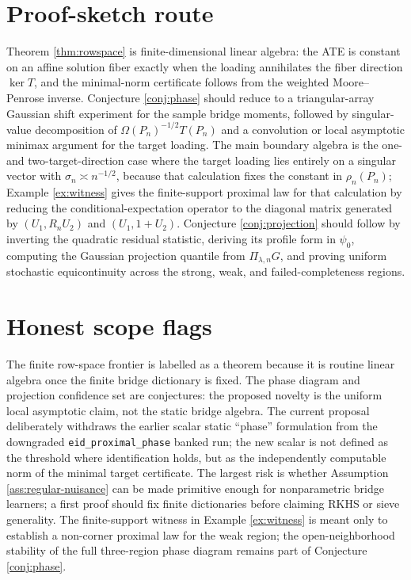\documentclass[11pt]{article}
\theoremstyle{definition}
\theoremstyle{plain}
\theoremstyle{remark}
\begin{document}
\section{Proof-sketch route}
Theorem \ref{thm:rowspace} is finite-dimensional linear algebra: the ATE is
constant on an affine solution fiber exactly when the loading annihilates the
fiber direction $\ker T$, and the minimal-norm certificate follows from the
weighted Moore--Penrose inverse.  Conjecture \ref{conj:phase} should reduce to
a triangular-array Gaussian shift experiment for the sample bridge moments,
followed by singular-value decomposition of
$\Omega(P_n)^{-1/2}T(P_n)$ and a convolution or local asymptotic minimax
argument for the target loading.  The main boundary algebra is the one- and
two-target-direction case where the target loading lies entirely on a singular
vector with $\sigma_n\asymp n^{-1/2}$, because that calculation fixes the
constant in $\rho_n(P_n)$; Example \ref{ex:witness} gives the finite-support
proximal law for that calculation by reducing the conditional-expectation
operator to the diagonal matrix generated by $(U_1,R_nU_2)$ and
$(U_1,1+U_2)$.  Conjecture \ref{conj:projection} should follow by
inverting the quadratic residual statistic, deriving its profile form in
$\psi_0$, computing the Gaussian projection quantile from
$\Pi_{\lambda,n}G$, and proving uniform stochastic equicontinuity across the
strong, weak, and failed-completeness regions.

\section{Honest scope flags}
The finite row-space frontier is labelled as a theorem because it is routine
linear algebra once the finite bridge dictionary is fixed.  The phase diagram
and projection confidence set are conjectures: the proposed novelty is the
uniform local asymptotic claim, not the static bridge algebra.  The current
proposal deliberately withdraws the earlier scalar static ``phase''
formulation from the downgraded \texttt{eid\_proximal\_phase} banked run; the
new scalar is not defined as the threshold where identification holds, but as
the independently computable norm of the minimal target certificate.  The
largest risk is whether Assumption \ref{ass:regular-nuisance} can be made
primitive enough for nonparametric bridge learners; a first proof should fix
finite dictionaries before claiming RKHS or sieve generality.  The
finite-support witness in Example \ref{ex:witness} is meant only to establish a
non-corner proximal law for the weak region; the open-neighborhood stability of
the full three-region phase diagram remains part of Conjecture
\ref{conj:phase}.
\end{document}
